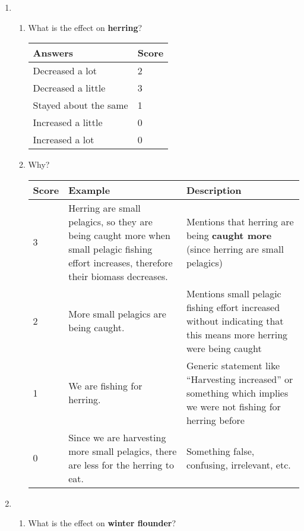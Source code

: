 {\setlength{\itemsep}{2em}
\begin{enumerate}


\item 
\begin{enumerate}
\item What is the effect on \textbf{herring}? 

{\small
{}
\begin{tabular}{| l | l |} \hline
\rowcolor{cyan!35} \textbf{Answers} & \textbf{Score} \\ \hline
Decreased a lot & 2 \\ 
Decreased a little & 3 \\ 
Stayed about the same & 1 \\ 
Increased a little & 0 \\
Increased a lot & 0 \\
\hline
\end{tabular}
}

\item Why?

{\small
{}
\begin{tabular}{| l | p{5.25cm} | p{5.7cm} |} \hline
\rowcolor{cyan!35} \textbf{Score} & \textbf{Example} & \textbf{Description} \\ \hline
3 & Herring are small pelagics, so they are being caught more when small pelagic fishing effort increases, therefore their biomass decreases. & Mentions that herring are being \textbf{caught more} (since herring are small pelagics) \\ 
2 & More small pelagics are being caught. & Mentions small pelagic fishing effort increased without indicating that this means more herring were being caught \\ 
1 & We are fishing for herring. & Generic statement like ``Harvesting increased'' or something which implies we were not fishing for herring before \\ 
0 & Since we are harvesting more small pelagics, there are less for the herring to eat. & Something false, confusing, irrelevant, etc. \\
\hline
\end{tabular}
}

\end{enumerate}

\clearpage

\item 
\begin{enumerate}
\item What is the effect on \textbf{winter flounder}?


\end{enumerate}
\end{enumerate}}

